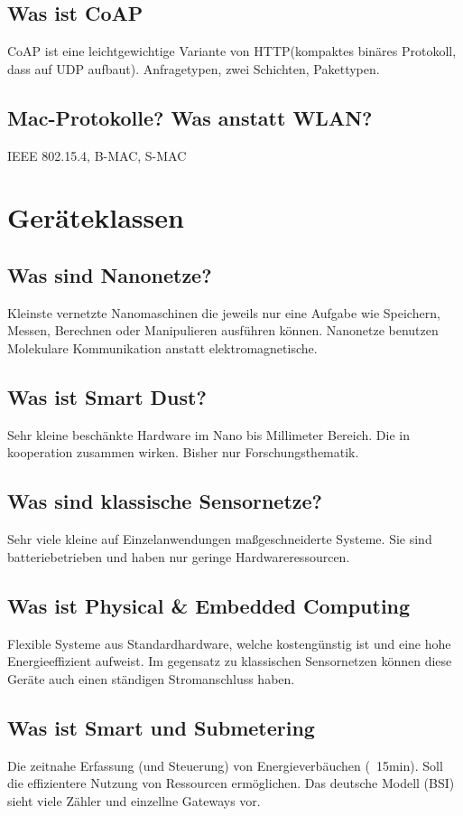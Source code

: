 	\subsection{Was ist CoAP}
	CoAP ist eine leichtgewichtige Variante von HTTP(kompaktes binäres Protokoll, dass auf UDP aufbaut).
	Anfragetypen, zwei Schichten, Pakettypen.
	
	\subsection{Mac-Protokolle? Was anstatt WLAN?}
	IEEE 802.15.4, B-MAC, S-MAC
	
	
\section{Geräteklassen}
	\subsection{Was sind Nanonetze?}
	Kleinste vernetzte Nanomaschinen die jeweils nur eine Aufgabe wie Speichern, Messen, Berechnen oder Manipulieren ausführen können. Nanonetze benutzen Molekulare Kommunikation anstatt elektromagnetische.
	
	\subsection{Was ist Smart Dust?}
	Sehr kleine beschänkte Hardware im Nano bis Millimeter Bereich. Die in kooperation zusammen wirken. Bisher nur Forschungsthematik. 
	
	\subsection{Was sind klassische Sensornetze?}
	Sehr viele kleine auf Einzelanwendungen maßgeschneiderte Systeme. Sie sind batteriebetrieben und haben nur geringe Hardwareressourcen.
	
	\subsection{Was ist Physical \& Embedded Computing}
	Flexible Systeme aus Standardhardware, welche kostengünstig ist und eine hohe Energieeffizient aufweist. Im gegensatz zu klassischen Sensornetzen können diese Geräte auch einen ständigen Stromanschluss haben.
	
	\subsection{Was ist Smart\- und Submetering}
	Die zeitnahe Erfassung (und Steuerung) von Energieverbäuchen (~15min). Soll die effizientere Nutzung von Ressourcen ermöglichen. Das deutsche Modell (BSI) sieht viele Zähler und einzellne Gateways vor. 
	
